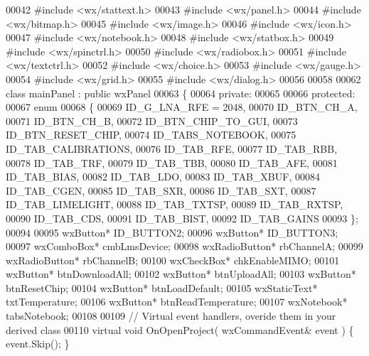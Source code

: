 \begin{DoxyCode}
00042 \textcolor{preprocessor}{#include <wx/stattext.h>}
00043 \textcolor{preprocessor}{#include <wx/panel.h>}
00044 \textcolor{preprocessor}{#include <wx/bitmap.h>}
00045 \textcolor{preprocessor}{#include <wx/image.h>}
00046 \textcolor{preprocessor}{#include <wx/icon.h>}
00047 \textcolor{preprocessor}{#include <wx/notebook.h>}
00048 \textcolor{preprocessor}{#include <wx/statbox.h>}
00049 \textcolor{preprocessor}{#include <wx/spinctrl.h>}
00050 \textcolor{preprocessor}{#include <wx/radiobox.h>}
00051 \textcolor{preprocessor}{#include <wx/textctrl.h>}
00052 \textcolor{preprocessor}{#include <wx/choice.h>}
00053 \textcolor{preprocessor}{#include <wx/gauge.h>}
00054 \textcolor{preprocessor}{#include <wx/grid.h>}
00055 \textcolor{preprocessor}{#include <wx/dialog.h>}
00056 
00058 
00062 \textcolor{keyword}{class }mainPanel : \textcolor{keyword}{public} wxPanel 
00063 \{
00064     \textcolor{keyword}{private}:
00065     
00066     \textcolor{keyword}{protected}:
00067         \textcolor{keyword}{enum}
00068         \{
00069             ID_G_LNA_RFE = 2048,
00070             ID_BTN_CH_A,
00071             ID_BTN_CH_B,
00072             ID_BTN_CHIP_TO_GUI,
00073             ID_BTN_RESET_CHIP,
00074             ID_TABS_NOTEBOOK,
00075             ID_TAB_CALIBRATIONS,
00076             ID_TAB_RFE,
00077             ID_TAB_RBB,
00078             ID_TAB_TRF,
00079             ID_TAB_TBB,
00080             ID_TAB_AFE,
00081             ID_TAB_BIAS,
00082             ID_TAB_LDO,
00083             ID_TAB_XBUF,
00084             ID_TAB_CGEN,
00085             ID_TAB_SXR,
00086             ID_TAB_SXT,
00087             ID_TAB_LIMELIGHT,
00088             ID_TAB_TXTSP,
00089             ID_TAB_RXTSP,
00090             ID_TAB_CDS,
00091             ID_TAB_BIST,
00092             ID_TAB_GAINS
00093         \};
00094         
00095         wxButton* ID_BUTTON2;
00096         wxButton* ID_BUTTON3;
00097         wxComboBox* cmbLmsDevice;
00098         wxRadioButton* rbChannelA;
00099         wxRadioButton* rbChannelB;
00100         wxCheckBox* chkEnableMIMO;
00101         wxButton* btnDownloadAll;
00102         wxButton* btnUploadAll;
00103         wxButton* btnResetChip;
00104         wxButton* btnLoadDefault;
00105         wxStaticText* txtTemperature;
00106         wxButton* btnReadTemperature;
00107         wxNotebook* tabsNotebook;
00108         
00109         \textcolor{comment}{// Virtual event handlers, overide them in your derived class}
00110         \textcolor{keyword}{virtual} \textcolor{keywordtype}{void} OnOpenProject( wxCommandEvent& event ) \{ \textcolor{keyword}{event}.Skip(); \}

\end{DoxyCode}
